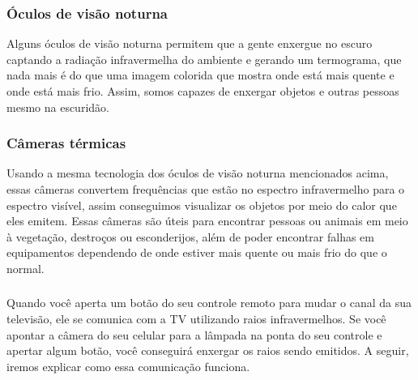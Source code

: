 \documentclass[conference]{IEEEtran}
\begin{document}
\begin{center}
    \subsubsection{Óculos de visão noturna}
\end{center}
\par
Alguns óculos de visão noturna permitem que a gente enxergue no escuro captando a radiação infravermelha do ambiente e gerando um termograma, que nada mais é do que uma imagem colorida que mostra onde está mais quente e onde está mais frio. Assim, somos capazes de enxergar objetos e outras pessoas mesmo na escuridão.

\begin{center}
    \subsubsection{Câmeras térmicas}
\end{center}
\par
Usando a mesma tecnologia dos óculos de visão noturna mencionados acima, essas câmeras convertem frequências que estão no espectro infravermelho para o espectro visível, assim conseguimos visualizar os objetos por meio do calor que eles emitem. Essas câmeras são úteis para encontrar pessoas ou animais em meio à vegetação, destroços ou esconderijos, além de poder encontrar falhas em equipamentos dependendo de onde estiver mais quente ou mais frio do que o normal.

\begin{center}
    \subsubsection{}
\end{center}
\par
Quando você aperta um botão do seu controle remoto para mudar o canal da sua televisão, ele se comunica com a TV utilizando raios infravermelhos. Se você apontar a câmera do seu celular para a lâmpada na ponta do seu controle e apertar algum botão, você conseguirá enxergar os raios sendo emitidos. A seguir, iremos explicar como essa comunicação funciona.
\end{document}
